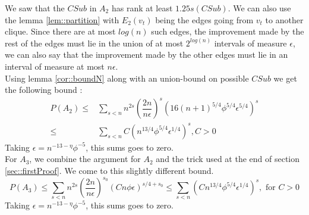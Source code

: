 We saw that the $CSub$ in $A_2$ has rank at least $1.25s(CSub)$. We can also use the lemma \ref{lem::partition} with $E_2(v_t)$ being the edges going from $v_t$ to another clique. Since there are at most $log(n)$ such edges, the improvement made by the rest of the edges must lie in the union of at most $2^{log(n)}$ intervals of measure $\epsilon$, we can also say that the improvement made by the other edges must lie in an interval of measure at most $n\epsilon$.\\
Using lemma \ref{cor::boundN} along with an union-bound on possible $CSub$ we get the following bound :
 \begin{equation*}
 \begin{split}
 P(A_2) \leq &\sum_{s<n}n^{2s}\left(\dfrac{2n}{n\epsilon}\right)^s (16(n + 1)^{5/4}\phi^{5/4}\epsilon^{5/4})^s \\
 \leq & \sum_{s<n} C(n^{13/4}\phi^{5/4}\epsilon^{1/4})^s,  C > 0
 \end{split}
 \end{equation*}
 Taking $\epsilon = n^{-13-\eta}\phi^{-5}$, this sums goes to zero.\\
 
 For $A_3$, we combine the argument for $A_2$ and the trick used at the end of section \ref{sec::firstProof}. We come to this slightly different bound.
 \begin{equation*}
P(A_3) \leq  \sum_{s < n}n^{2s}\left(\dfrac{2n}{n\epsilon}\right)^{s_0}(Cn\phi\epsilon)^{s/4 + s_0} \leq \sum_{s < n}(Cn^{13/4}\phi^{5/4}\epsilon^{1/4})^{s}, \text{ for } C > 0 
\end{equation*}
 Taking $\epsilon = n^{-13-\eta}\phi^{-5}$, this sums goes to zero.
